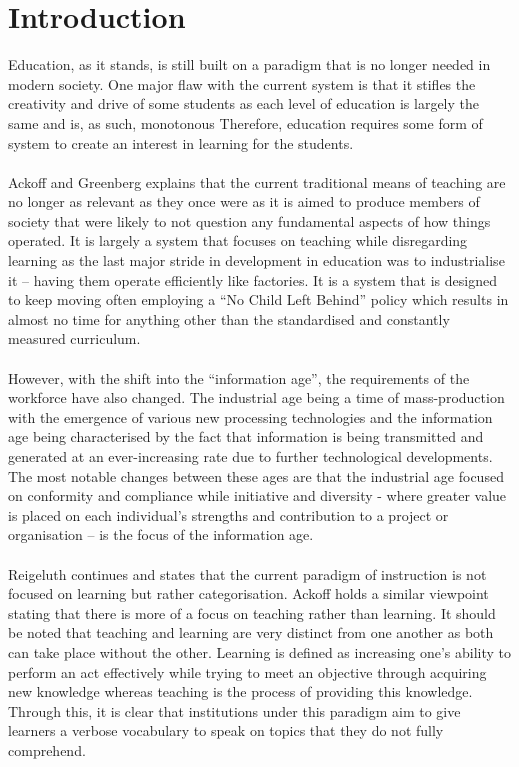 \documentclass[conference]{IEEEtran}
\begin{document}
\section{Introduction}
Education, as it stands, is still built on a paradigm that is no longer needed in modern society. One major flaw with the current system is that it stifles the creativity and drive of some students as each level of education is largely the same and is, as such, monotonous\cite{Ackoff2008} Therefore, education requires some form of system to create an interest in learning for the students.
\\\\
Ackoff and Greenberg\cite{Ackoff2008} explains that the current traditional means of teaching are no longer as relevant as they once were as it is aimed to produce members of society that were likely to not question any fundamental aspects of how things operated. It is largely a system that focuses on teaching while disregarding learning as the last major stride in development in education was to industrialise it – having them operate efficiently like factories\cite{Ackoff2008}. It is a system that is designed to keep moving often employing a “No Child Left Behind” policy which results in almost no time for anything other than the standardised and constantly measured curriculum\cite{gibson2006games}. 
\\\\
However, with the shift into the “information age”, the requirements of the workforce have also changed. The industrial age being a time of mass-production with the emergence of various new processing technologies and the information age being characterised by the fact that information is being transmitted and generated at an ever-increasing rate due to further technological developments\cite{gibson2006games, Reigeluth1996}. The most notable changes between these ages are that the industrial age focused on conformity and compliance while initiative and diversity - where greater value is placed on each individual’s strengths and contribution to a project or organisation – is the focus of the information age\cite{Reigeluth1996}.  
\\\\
Reigeluth\cite{Reigeluth1996} continues and states that the current paradigm of instruction is not focused on learning but rather categorisation. Ackoff\cite{Ackoff1991} holds a similar viewpoint stating that there is more of a focus on teaching rather than learning. It should be noted that teaching and learning are very distinct from one another as both can take place without the other\cite{Ackoff1991}. Learning is defined as increasing one’s ability to perform an act effectively while trying to meet an objective through acquiring new knowledge whereas teaching is the process of providing this knowledge\cite{Ackoff1991}. Through this, it is clear that institutions under this paradigm aim to give learners a verbose vocabulary to speak on topics that they do not fully comprehend\cite{Ackoff1991}. 
\end{document}
